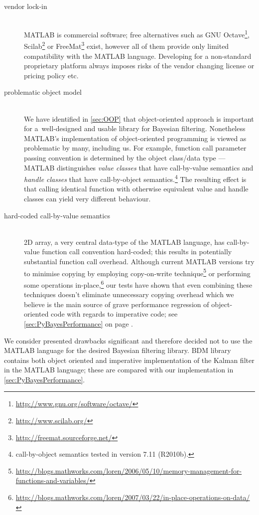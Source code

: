 \begin{description}
	\item[vendor lock-in] \hfill \\
		MATLAB is commercial software; free alternatives such as GNU
		Octave\footnote{\url{http://www.gnu.org/software/octave/}},
		Scilab\footnote{\url{http://www.scilab.org/}} or
		FreeMat\footnote{\url{http://freemat.sourceforge.net/}} exist, however all of them provide
		only limited compatibility with the MATLAB language. Developing for a non-standard proprietary
		platform always imposes risks of the vendor changing license or pricing policy etc.
	\item[problematic object model] \hfill \\
		We have identified in \autoref{sec:OOP} that object-oriented approach is important for
		a~well-designed and usable library for Bayesian filtering. Nonetheless MATLAB's
		implementation of object-oriented programming is viewed as problematic by many, including us. For
		example, function call parameter passing convention is determined by the object class/data
		type --- MATLAB distinguishes \emph{value classes} that have call-by-value semantics and
		\emph{handle classes} that have call-by-object semantics.\footnote{call-by-object semantics
		tested in version 7.11 (R2010b).} The resulting effect is that calling
		identical function with otherwise equivalent value and handle classes can yield very
		different behaviour.
	\item[hard-coded call-by-value semantics] \hfill \\
		2D array, a very central data-type of the MATLAB language, has call-by-value function call
		convention hard-coded; this results in potentially substantial function call overhead.
		Although current MATLAB versions try to minimise copying by employing copy-on-write
		technique\footnote{\url{http://blogs.mathworks.com/loren/2006/05/10/memory-management-for-functions-and-variables/}}
		or performing some operations in-place,\footnote{\url{http://blogs.mathworks.com/loren/2007/03/22/in-place-operations-on-data/}}
		our tests have shown that even combining these techniques doesn't eliminate unnecessary
		copying overhead which we believe is the main source of grave performance regression of
		object-oriented code with regards to imperative code; see \autoref{sec:PyBayesPerformance}
		on page \pageref{sec:PyBayesPerformance}.
\end{description}
We consider presented drawbacks significant and therefore decided not to use the MATLAB language for
the desired Bayesian filtering library. BDM library~\cite{BDM} contains both object oriented and
imperative implementation of the Kalman filter in the MATLAB language; these are compared with our
implementation in \autoref{sec:PyBayesPerformance}.

